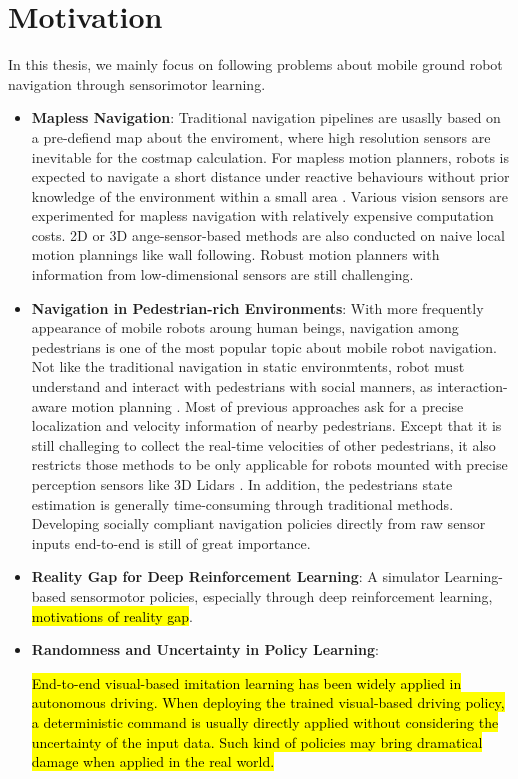 \section{Motivation}
In this thesis, we mainly focus on following problems about mobile ground robot navigation through sensorimotor learning.
\begin{itemize}
\item \textbf{Mapless Navigation}:
Traditional navigation pipelines are usaslly based on a pre-defiend map about the enviroment, where high resolution sensors are inevitable for the costmap calculation. For mapless motion planners, robots is expected to navigate a short distance under reactive behaviours without prior knowledge of the environment within a small area \cite{bonin2008visual, guzel2013autonomous}. Various vision sensors \cite{guerrero2005visual, guzel2012behaviour, liu2013visual} are experimented for mapless navigation with relatively expensive computation costs.
2D or 3D ange-sensor-based methods \cite{kamon1999range, ulrich1998vfh+} are also conducted on naive local motion plannings like wall following. Robust motion planners with information from low-dimensional sensors are still challenging.

\item \textbf{Navigation in Pedestrian-rich Environments}:
With more frequently appearance of mobile robots aroung human beings, navigation among pedestrians is one of the most popular topic about mobile robot navigation. Not like the traditional navigation in static environmtents, robot must understand and interact with pedestrians with social manners, as interaction-aware motion planning \cite{pfeiffer2018learning}.
Most of previous approaches ask for a precise localization and velocity information of nearby pedestrians. Except that it is still challeging to collect the real-time velocities of other pedestrians, it also restricts those methods to be only applicable for robots mounted with precise perception sensors like 3D Lidars \cite{pfeiffer2016predicting, Chen17_IROS}.
In addition, the pedestrians state estimation is generally time-consuming through traditional methods.
Developing socially compliant navigation policies directly from raw sensor inputs end-to-end is still of great importance.

\item \textbf{Reality Gap for Deep Reinforcement Learning}:
A simulator Learning-based sensormotor policies, especially through deep reinforcement learning, \hl{motivations of reality gap}.

\item \textbf{Randomness and Uncertainty in Policy Learning}:

\hl{End-to-end visual-based imitation learning has been widely applied in autonomous driving. When deploying the trained visual-based driving policy, a deterministic command is usually directly applied without considering the uncertainty of the input data. Such kind of policies may bring dramatical damage when applied in the real world.}

\end{itemize}
